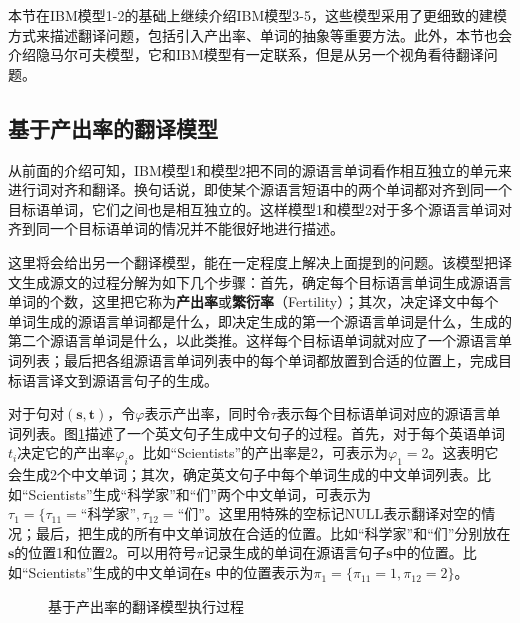 \parinterval 本节在IBM模型1-2的基础上继续介绍IBM模型3-5，这些模型采用了更细致的建模方式来描述翻译问题，包括引入产出率、单词的抽象等重要方法。此外，本节也会介绍隐马尔可夫模型，它和IBM模型有一定联系，但是从另一个视角看待翻译问题。


\subsection{基于产出率的翻译模型}

\parinterval 从前面的介绍可知，IBM模型1和模型2把不同的源语言单词看作相互独立的单元来进行词对齐和翻译。换句话说，即使某个源语言短语中的两个单词都对齐到同一个目标语单词，它们之间也是相互独立的。这样模型1和模型2对于多个源语言单词对齐到同一个目标语单词的情况并不能很好地进行描述。

\parinterval 这里将会给出另一个翻译模型，能在一定程度上解决上面提到的问题。该模型把译文生成源文的过程分解为如下几个步骤：首先，确定每个目标语言单词生成源语言单词的个数，这里把它称为{\small\sffamily\bfseries{产出率}}或{\small\sffamily\bfseries{繁衍率}}（Fertility）；其次，决定译文中每个单词生成的源语言单词都是什么，即决定生成的第一个源语言单词是什么，生成的第二个源语言单词是什么，以此类推。这样每个目标语单词就对应了一个源语言单词列表；最后把各组源语言单词列表中的每个单词都放置到合适的位置上，完成目标语言译文到源语言句子的生成。

\parinterval 对于句对$(\mathbf{s},\mathbf{t})$，令$\varphi$表示产出率，同时令${\tau}$表示每个目标语单词对应的源语言单词列表。图{\ref{fig:3-29}}描述了一个英文句子生成中文句子的过程。首先，对于每个英语单词$t_i$决定它的产出率$\varphi_{i}$。比如``Scientists''的产出率是2，可表示为${\varphi}_{1}=2$。这表明它会生成2个中文单词；其次，确定英文句子中每个单词生成的中文单词列表。比如``Scientists''生成``科学家''和``们''两个中文单词，可表示为${\tau}_1=\{{\tau}_{11}=\textrm{``科学家''},{\tau}_{12}=\textrm{``们''}$。这里用特殊的空标记NULL表示翻译对空的情况；最后，把生成的所有中文单词放在合适的位置。比如``科学家''和``们''分别放在$\mathbf{s}$的位置1和位置2。可以用符号$\pi$记录生成的单词在源语言句子$\mathbf{s}$中的位置。比如``Scientists''生成的中文单词在$\mathbf{s}$ 中的位置表示为${\pi}_{1}=\{{\pi}_{11}=1,{\pi}_{12}=2\}$。

\begin{figure}[htp]
    \centering

   \caption{基于产出率的翻译模型执行过程}
   \label{fig:3-29}
\end{figure}

